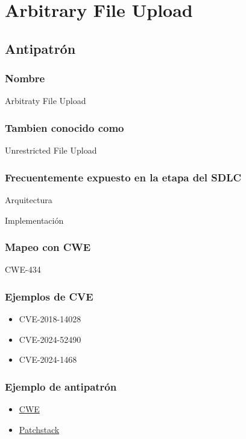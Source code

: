 \chapter{Arbitrary File Upload}
\section{Antipatrón}
\subsection{Nombre}
Arbitraty File Upload
\subsection{Tambien conocido como}
Unrestricted File Upload

\subsection{Frecuentemente expuesto en la etapa del SDLC}
Arquitectura

Implementación
\subsection{Mapeo con CWE}
CWE-434
\subsection{Ejemplos de CVE}
\begin{itemize}
    \item CVE-2018-14028
    \item CVE-2024-52490
    \item CVE-2024-1468
\end{itemize}

\subsection{Ejemplo de antipatrón}
\begin{itemize}
    \item \href{https://cwe.mitre.org/data/definitions/434.html}{CWE}
    \item \href{https://patchstack.com/academy/wordpress/vulnerabilities/arbitrary-file-upload/}{Patchstack}
\end{itemize}
